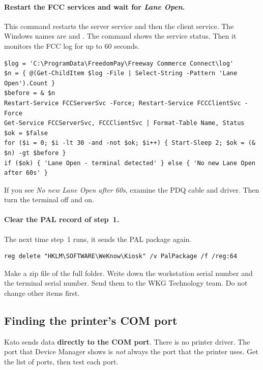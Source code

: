 \documentclass[a4paper,10pt]{article}
\begin{document}
\paragraph{Restart the FCC services and wait for \emph{Lane Open}.}
This command restarts the server service and then the client service. The
Windows names are  and . The
command shows the service status. Then it monitors the FCC log for up to
60 seconds.

\begin{lstlisting}
$log = 'C:\ProgramData\FreedomPay\Freeway Commerce Connect\log'
$n = { @(Get-ChildItem $log -File | Select-String -Pattern 'Lane Open').Count }
$before = & $n
Restart-Service FCCServerSvc -Force; Restart-Service FCCClientSvc -Force
Get-Service FCCServerSvc, FCCClientSvc | Format-Table Name, Status
$ok = $false
for ($i = 0; $i -lt 30 -and -not $ok; $i++) { Start-Sleep 2; $ok = (& $n) -gt $before }
if ($ok) { 'Lane Open - terminal detected' } else { 'No new Lane Open after 60s' }
\end{lstlisting}

\noindent If you see \emph{No new Lane Open after 60s}, examine the PDQ cable and
driver. Then turn the terminal off and on.

\paragraph{Clear the PAL record of step~1.} The next time step~1 runs, it
sends the PAL package again.

\begin{lstlisting}
reg delete "HKLM\SOFTWARE\WeKnow\Kiosk" /v PalPackage /f /reg:64
\end{lstlisting}

\begin{wkinfo}
Make a zip file of the full  folder. Write down the workstation
serial number and the terminal serial number. Send them to the WKG
Technology team. Do not change other items first.
\end{wkinfo}

\subsection{Finding the printer's COM port}\label{sec:comport}

\begin{wkwarn}
Kato sends data \textbf{directly to the COM port}. There is no printer
driver. The port that Device Manager shows is \emph{not} always the port
that the printer uses. Get the list of ports, then test each port.
\end{wkwarn}
\end{document}
